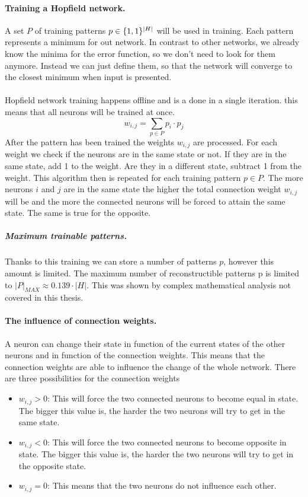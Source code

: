 \documentclass[pdftex,a4paper,12pt,twoside]{report}
\theoremstyle{plain} \newtheorem{theorem}{Theorem} \newtheorem{proposition}{Proposition} \newtheorem{lemma}{Lemma} \newtheorem*{corollary}{Corollary}
\theoremstyle{definition} \newtheorem{definition}{Definition} \newtheorem{conjecture}{Conjecture} \newtheorem*{example}{Example} \newtheorem{algorithm}{Algorithm}
\theoremstyle{remark} \newtheorem*{remark}{Remark} \newtheorem*{note}{Note} \newtheorem{case}{Case}
\begin{document}
\paragraph{Training a Hopfield network.}
A set $P$ of training patterns $p \in \{\-1,1\}^{|H|}$ will be used in training. Each pattern represents a minimum for out network. In contrast to other networks, we already know the minima for the error function, so we don't need to look for them anymore. Instead we can just define them, so that the network will converge to the closest minimum when input is presented.\\\\Hopfield network training happens offline and is a done in a single iteration. this means that all neurons will be trained at once.
\begin{equation}
w_{i,j} = \sum_{p \in P} p_i \cdot p_j
\end{equation}
After the pattern has been trained the weights $w_{i,j}$ are processed. For each weight we check if the neurons are in the same state or not. If they are in the same state, add 1 to the weight. Are they in a different state, subtract 1 from the weight. This algorithm then is repeated for each training pattern $p \in P$. The more neurons $i$ and $j$ are in the same state the higher the total connection weight $w_{i,j}$ will be and the more the connected neurons will be forced to attain the same state. The same is true for the opposite.
\subparagraph{Maximum trainable patterns.}
Thanks to this training we can store a number of patterns $p$, however this amount is limited. The maximum number of reconstructible patterns p is limited to $|P|_{MAX} \approx  0.139 \cdot |H|$. This was shown by complex mathematical analysis not covered in this thesis.
\paragraph{The influence of connection weights.}
A neuron can change their state in function of the current states of the other neurons and in function of the  connection weights. This means that the connection weights are able to influence the change of the whole network. There are three possibilities for the connection weights
\begin{itemize}
\item$w_{i,j} > 0 $: This will force the two connected neurons to become equal in state. The bigger this value is, the harder the two neurons will try to get in the same state.
\item$w_{i,j} < 0 $: This will force the two connected neurons to become opposite in state. The bigger this value is, the harder the two neurons will try to get in the opposite state.
\item$w_{i,j} = 0 $: This means that the two neurons do not influence each other.
\end{itemize}
\end{document}
